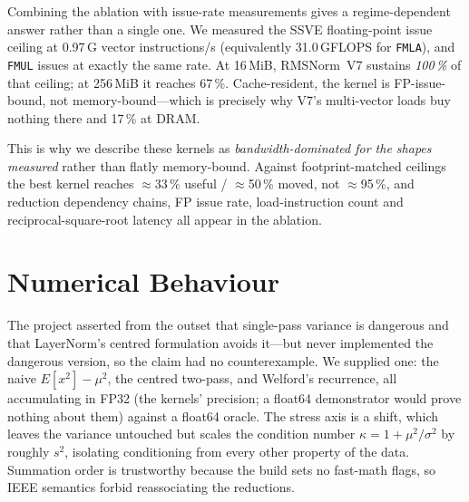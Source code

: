 \documentclass[conference,10pt]{IEEEtran}
\newcommand{\code}[1]{\texttt{\small #1}}
\begin{document}
Combining the ablation with issue-rate measurements gives a regime-dependent
answer rather than a single one. We measured the SSVE floating-point issue
ceiling at 0.97\,G vector instructions/s (equivalently 31.0\,GFLOPS for
\code{FMLA}), and \code{FMUL} issues at exactly the same rate. At 16\,MiB,
RMSNorm~V7 sustains \emph{100\,\%} of that ceiling; at 256\,MiB it reaches
67\,\%. Cache-resident, the kernel is FP-issue-bound, not memory-bound---which
is precisely why V7's multi-vector loads buy nothing there and 17\,\% at DRAM.

This is why we describe these kernels as \emph{bandwidth-dominated for the
shapes measured} rather than flatly memory-bound. Against footprint-matched
ceilings the best kernel reaches $\approx$33\,\% useful / $\approx$50\,\% moved,
not $\approx$95\,\%, and reduction dependency chains, FP issue rate,
load-instruction count and reciprocal-square-root latency all appear in the
ablation.

\section{Numerical Behaviour}
\label{sec:numerics}

The project asserted from the outset that single-pass variance is dangerous and
that LayerNorm's centred formulation avoids it---but never implemented the
dangerous version, so the claim had no counterexample. We supplied one: the
naive $E[x^2]-\mu^2$, the centred two-pass, and Welford's recurrence, all
accumulating in FP32 (the kernels' precision; a float64 demonstrator would prove
nothing about them) against a float64 oracle. The stress axis is a shift, which
leaves the variance untouched but scales the condition number
$\kappa = 1 + \mu^2/\sigma^2$ by roughly $s^2$, isolating conditioning from
every other property of the data. Summation order is trustworthy because the
build sets no fast-math flags, so IEEE semantics forbid reassociating the
reductions.
\end{document}
